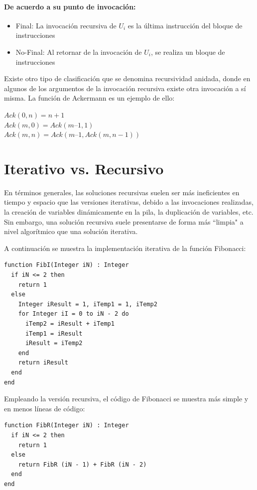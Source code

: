 \paragraph{De acuerdo a su punto de invocación:}
\begin{itemize}
\item Final: La invocación recursiva de $U_i$ es la última instrucción del bloque de instrucciones
\item No-Final: Al retornar de la invocación de $U_i$, se realiza un bloque de instrucciones
\end{itemize}

Existe otro tipo de clasificación que se denomina recursividad anidada, donde en algunos de los argumentos de la invocación recursiva existe otra invocación a sí misma. La función de Ackermann es un ejemplo de ello:

$Ack(0 , n) = n + 1$ \\
$Ack(m , 0) = Ack(m – 1 , 1)$ \\
$Ack(m , n) = Ack(m – 1 , Ack(m , n-1))$ 

\section{Iterativo vs. Recursivo}

En términos generales, las soluciones recursivas suelen ser más ineficientes en tiempo y espacio que las versiones iterativas, debido a las invocaciones realizadas, la creación de variables dinámicamente en la pila, la duplicación de variables, etc. Sin embargo, una solución recursiva suele presentarse de forma más ``limpia" a nivel algorítmico que una solución iterativa.

A continuación se muestra la implementación iterativa de la función Fibonacci:

\begin{lstlisting}[upquote=true, language=pseudo]
function FibI(Integer iN) : Integer
  if iN <= 2 then
	return 1
  else
    Integer iResult = 1, iTemp1 = 1, iTemp2
    for Integer iI = 0 to iN - 2 do
      iTemp2 = iResult + iTemp1
      iTemp1 = iResult
      iResult = iTemp2
    end
    return iResult
  end
end
\end{lstlisting}

Empleando la versión recursiva, el código de Fibonacci se muestra más simple y en menos líneas de código:

\begin{lstlisting}[upquote=true, language=pseudo]
function FibR(Integer iN) : Integer
  if iN <= 2 then
	return 1
  else
    return FibR (iN - 1) + FibR (iN - 2)
  end
end
\end{lstlisting}

